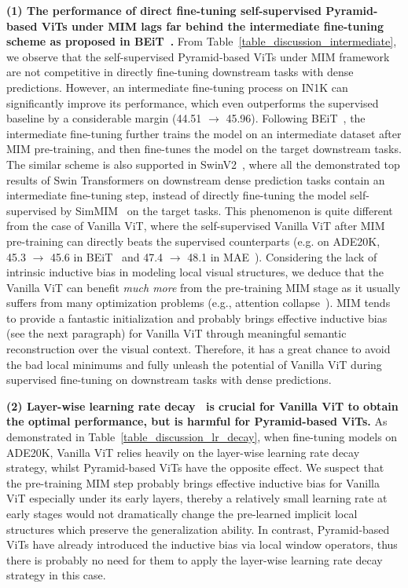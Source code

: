 \documentclass{article}
\begin{document}
\textbf{(1) The performance of direct fine-tuning self-supervised Pyramid-based ViTs under MIM lags far behind the intermediate fine-tuning scheme as proposed in BEiT~\cite{bao2021beit}.} From Table~\ref{table_discussion_intermediate}, we observe that the self-supervised Pyramid-based ViTs under MIM framework are not competitive in directly fine-tuning downstream tasks with dense predictions. However, an intermediate fine-tuning process on IN1K can significantly improve its performance, which even outperforms the supervised baseline by a considerable margin (44.51 $\to$ 45.96). Following BEiT~\cite{bao2021beit}, the intermediate fine-tuning further trains the model on an intermediate dataset after MIM pre-training, and then fine-tunes the model on the target downstream tasks. The similar scheme is also supported in SwinV2~\cite{liu2021swinv2}, where all the demonstrated top results of Swin Transformers on downstream dense prediction tasks contain an intermediate fine-tuning step, instead of directly fine-tuning the model self-supervised by SimMIM~\cite{xie2021simmim} on the target tasks. This phenomenon is quite different from the case of Vanilla ViT, where the self-supervised Vanilla ViT after MIM pre-training can directly beats the supervised counterparts (e.g. on ADE20K,  45.3 $\to$ 45.6 in BEiT~\cite{bao2021beit} and 47.4 $\to$ 48.1 in MAE~\cite{he2021masked}).
Considering the lack of intrinsic inductive bias in modeling local visual structures, 
we deduce that the {Vanilla ViT} can benefit \emph{much more} from the pre-training MIM stage as it usually suffers from many optimization problems (e.g., attention collapse~\cite{zhou2021deepvit}). MIM tends to provide a fantastic initialization and probably brings effective inductive bias (see the next paragraph) for Vanilla ViT through meaningful semantic reconstruction over the visual context. Therefore, it has a great chance to avoid the bad local minimums and fully unleash the potential of Vanilla ViT during supervised fine-tuning on downstream tasks with dense predictions.


\textbf{(2) Layer-wise learning rate decay~\cite{clark2020electra,bao2021beit} is crucial for Vanilla ViT to obtain the optimal performance, but is harmful for Pyramid-based ViTs.} As demonstrated in Table~\ref{table_discussion_lr_decay}, when fine-tuning models on ADE20K, Vanilla ViT relies heavily on the layer-wise learning rate decay strategy, whilst Pyramid-based ViTs have the opposite effect. We suspect that the pre-training MIM step probably brings effective inductive bias for Vanilla ViT especially under its early layers, thereby a relatively small learning rate at early stages would not dramatically change the pre-learned implicit local structures which preserve the generalization ability. In contrast, Pyramid-based ViTs have already introduced the inductive bias via local window operators, thus there is probably no need for them to apply the layer-wise learning rate decay strategy in this case.
\end{document}
